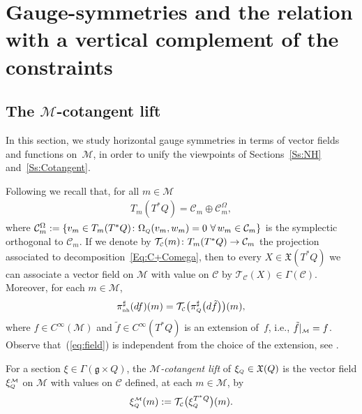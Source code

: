 \documentclass[pdftex]{sigma}
\numberwithin{equation}{section}
\def\M{\mathcal{M}}
\def\C{\mathcal{C}}
\def\g{\mathfrak{g}}
\def\nh{{\mbox{\tiny{nh}}}}
\def\subC{{\mbox{\tiny{$\C$}}}}
\def\subM{{\mbox{\tiny{$\M$}}}}
\def\subQQ{{\mbox{\tiny{$Q$}}}}
\begin{document}
\section[Gauge-symmetries and the relation with a vertical complement of the constraints]{Gauge-symmetries and the relation\\ with a vertical complement of the constraints}\label{S:GaugeSym}

\subsection[The $\M$-cotangent lift]{The $\boldsymbol{\M}$-cotangent lift}

In this section, we study horizontal gauge symmetries in terms of vector f\/ields
and functions on~$\M$, in order to unify the viewpoints of
Sections~\ref{Ss:NH} and~\ref{Ss:Cotangent}.

Following \cite{BS93,CushmanBook} we recall that, for all $m\in\M$
\begin{gather} \label{Eq:C+Comega}
T_m(T^*Q) = \C_m  \oplus {\C}_m^\Omega,
\end{gather}
where ${\C}^\Omega_m := \{ v_m \in T_m(T^*Q) \colon \Omega_{\mbox{\tiny{$Q$}}}
(v_m , w_m) = 0 \ \forall\, w_m \in {\C}_m\}$ is the symplectic orthogonal to $\C_m$.
If we denote by ${\mathcal T}_\subC(m) \colon T_m(T^*Q) \to \C_m$ the projection associated
to decomposition~\eqref{Eq:C+Comega}, then to every $X\in \mathfrak{X}(T^*Q)$
we can associate a vector f\/ield on $\M$ with value on $\C$ by
$\mathcal{T}_\C(X)\in \Gamma(\C)$. Moreover, for each $m\in \M$,
\begin{gather}\label{eq:field}
\pi_\nh^\sharp(df)(m) =  {\mathcal T}_\subC \big(\pi_\subQQ^\sharp\big(d \tilde f\big)\big)(m),
\end{gather}
where $f\in C^\infty(\M)$ and $\tilde f\in C^\infty(T^*Q)$ is an extension of~$f$,
i.e., $\tilde f|_\subM = f$.
Observe that~(\ref{eq:field}) is independent from the choice of the extension,
see \cite{IbLeMaMa1999, sniatycki}.

\begin{Definition}\label{Def:M-lift}
 For a section $\xi\in \Gamma(\g\times Q)$, the {\it $\M$-cotangent lift} of
 $\xi_\subQQ\in \mathfrak{X}(Q)$ is the vector f\/ield $\xi_\subQQ^\subM$ on $\M$
 with values on $\C$ def\/ined, at each $m\in\M$, by
 \begin{gather*}
 \xi_\subQQ^\subM (m) := {\mathcal T}_\subC \big(\xi_\subQQ^{T^*Q} \big)(m).
 \end{gather*}
\end{Definition}
\end{document}
